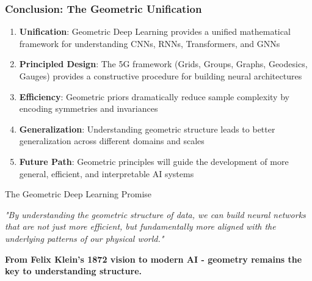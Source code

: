 \begin{frame}[fragile]\frametitle{Conclusion: The Geometric Unification}


\begin{enumerate}
\item \textbf{Unification}: Geometric Deep Learning provides a unified mathematical framework for understanding CNNs, RNNs, Transformers, and GNNs

\item \textbf{Principled Design}: The 5G framework (Grids, Groups, Graphs, Geodesics, Gauges) provides a constructive procedure for building neural architectures

\item \textbf{Efficiency}: Geometric priors dramatically reduce sample complexity by encoding symmetries and invariances

\item \textbf{Generalization}: Understanding geometric structure leads to better generalization across different domains and scales

\item \textbf{Future Path}: Geometric principles will guide the development of more general, efficient, and interpretable AI systems
\end{enumerate}

\vspace{0.5cm}

\begin{block}{The Geometric Deep Learning Promise}
\begin{center}
{\em "By understanding the geometric structure of data, we can build neural networks that are not just more efficient, but fundamentally more aligned with the underlying patterns of our physical world."}
\end{center}
\end{block}

\vspace{0.5cm}

\begin{center}
\textbf{From Felix Klein's 1872 vision to modern AI - geometry remains the key to understanding structure.}
\end{center}

\end{frame}

